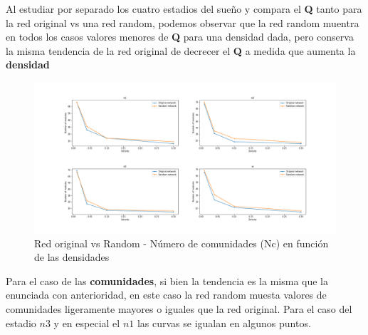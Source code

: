 Al estudiar por separado los cuatro estadios del sueño y compara el \textbf{Q} tanto para la red original vs una red random, podemos observar que la red random muentra en todos los casos valores menores de \textbf{Q} para una densidad dada, pero conserva la misma tendencia de la red original de decrecer el \textbf{Q} a medida que aumenta la \textbf{densidad}




\begin{figure}[H]
    \centering
    \includegraphics[width=\textwidth]{img/2_number_modules_vs_random.png}
    \caption{Red original vs Random - Número de comunidades (Nc) en función de las densidades}
    \label{fig:2_number_modules_vs_random}
\end{figure}


Para el caso de las \textbf{comunidades}, si bien la tendencia es la misma que la enunciada con anterioridad, en este caso la red random muesta valores de comunidades ligeramente mayores o iguales que la red original. Para el caso del estadio $n3$ y en especial el $n1$ las curvas se igualan en algunos puntos.